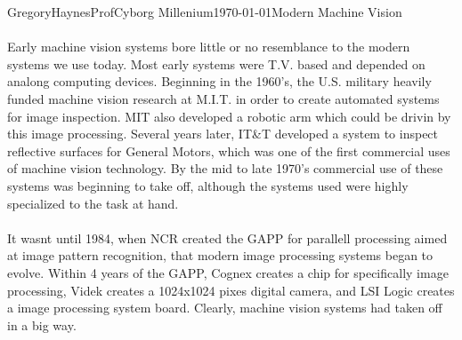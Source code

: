 \documentclass[a4paper,10pt]{article}
\begin{document}
\begin{mla}{Gregory}{Haynes}{Prof}{Cyborg Millenium}{\today}{Modern Machine Vision}
\paragraph{}Early machine vision systems bore little or no resemblance to the modern systems we use today.  Most early systems were T.V. based and depended on analong computing devices.  Beginning in the 1960's, the U.S. military heavily funded machine vision research at M.I.T. in order to create automated systems for image inspection. \cite{UMI:BOOK}  MIT also developed a robotic arm which could be drivin by this image processing. \cite{MVI:SITE}  Several years later, IT\&T developed a system to inspect reflective surfaces for General Motors, which was one of the first commercial uses of machine vision technology. \cite{UMI:BOOK}  By the mid to late 1970's commercial use of these systems was beginning to take off, although the systems used were highly specialized to the task at hand.

\paragraph{}It wasnt until 1984, when NCR created the GAPP for parallell processing aimed at image pattern recognition, that modern image processing systems began to evolve.\cite{UMI:BOOK}  Within 4 years of the GAPP, Cognex creates a chip for specifically image processing, Videk creates a 1024x1024 pixes digital camera, and LSI Logic creates a image processing system board. \cite{UMI:BOOK}  Clearly, machine vision systems had taken off in a big way.

\paragraph{}




\end{mla}
\end{document}
